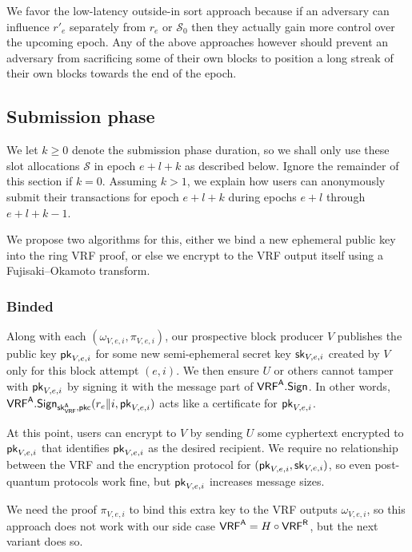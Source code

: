 We favor the low-latency outside-in sort approach because if an adversary can influence $r'_e$ separately from $r_e$ or $\mathcal{S}_0$ then they actually gain more control over the upcoming epoch.  Any of the above approaches however should prevent an adversary from sacrificing some of their own blocks to position a long streak of their own blocks towards the end of the epoch.  


\subsection{Submission phase}\label{subsec:submission_phase}

We let $k \ge 0$ denote the submission phase duration, so we shall only use these slot allocations $\mathcal{S}$ in epoch $e+l+k$ as described below.  Ignore the remainder of this section if $k=0$.  Assuming $k>1$, we explain how users can anonymously submit their transactions for epoch $e+l+k$ during epochs $e+l$ through $e+l+k-1$.

We propose two algorithms for this, either we bind a new ephemeral public key into the ring VRF proof, or else we encrypt to the VRF output itself using a Fujisaki–Okamoto transform. 

\subsubsection{Binded}

Along with each $(\omega_{V,e,i},\pi_{V,e,i})$, our prospective block producer $V$ publishes the public key $\mathsf{pk}_{V,e,i}$ for some new semi-ephemeral secret key $\mathsf{sk}_{V,e,i}$ created by $V$ only for this block attempt $(e,i)$.  We then ensure $U$ or others cannot tamper with $\mathsf{pk}_{V,e,i}$ by signing it with the message part of $\mathsf{VRF}^{\mathsf{A}}.\mathsf{Sign}$.  In other words, $\mathsf{VRF}^{\mathsf{A}}.\mathsf{Sign}_{\mathsf{sk}_{\mathsf{VRF}}^{\mathsf{A}},\mathsf{pkc}}(r_e \| i, \mathsf{pk}_{V,e,i})$ acts like a certificate for $\mathsf{pk}_{V,e,i}$.

At this point, users can encrypt to $V$ by sending $U$ some cyphertext encrypted to $\mathsf{pk}_{V,e,i}$ that identifies $\mathsf{pk}_{V,e,i}$ as the desired recipient.  We require no relationship between the VRF and the encryption protocol for $(\mathsf{pk}_{V,e,i},\mathsf{sk}_{V,e,i})$, so even post-quantum protocols work fine, but $\mathsf{pk}_{V,e,i}$ increases message sizes.

We need the proof $\pi_{V,e,i}$ to bind this extra key to the VRF outputs $\omega_{V,e,i}$, so this approach does not work with our side case $\mathsf{VRF}^{\mathsf{A}} = H \circ \mathsf{VRF}^{\mathsf{R}}$, but the next variant does so.

